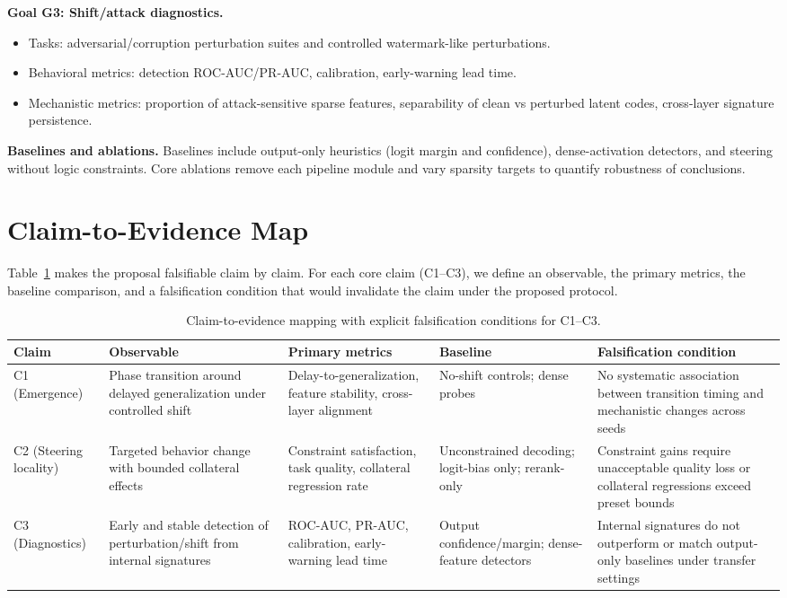 \documentclass[../ppgc-tese.tex]{subfiles}
\begin{document}
\textbf{Goal G3: Shift/attack diagnostics.}
\begin{itemize}
    \item Tasks: adversarial/corruption perturbation suites and controlled watermark-like perturbations.
    \item Behavioral metrics: detection ROC-AUC/PR-AUC, calibration, early-warning lead time.
    \item Mechanistic metrics: proportion of attack-sensitive sparse features, separability of clean vs perturbed latent codes, cross-layer signature persistence.
\end{itemize}

\textbf{Baselines and ablations.}
Baselines include output-only heuristics (logit margin and confidence), dense-activation detectors, and steering without logic constraints. Core ablations remove each pipeline module and vary sparsity targets to quantify robustness of conclusions.

\section{Claim-to-Evidence Map}
\label{sec:claim-evidence-map}
Table~\ref{tab:claim-evidence-falsification} makes the proposal falsifiable claim by claim. For each core claim (C1--C3), we define an observable, the primary metrics, the baseline comparison, and a falsification condition that would invalidate the claim under the proposed protocol.

\begin{table}[ht]
\centering
\small
\begin{tabular}{p{}p{}p{}p{}p{}}
\hline
\textbf{Claim} & \textbf{Observable} & \textbf{Primary metrics} & \textbf{Baseline} & \textbf{Falsification condition} \\
\hline
C1 (Emergence) &
Phase transition around delayed generalization under controlled shift &
Delay-to-generalization, feature stability, cross-layer alignment &
No-shift controls; dense probes &
No systematic association between transition timing and mechanistic changes across seeds \\

C2 (Steering locality) &
Targeted behavior change with bounded collateral effects &
Constraint satisfaction, task quality, collateral regression rate &
Unconstrained decoding; logit-bias only; rerank-only &
Constraint gains require unacceptable quality loss or collateral regressions exceed preset bounds \\

C3 (Diagnostics) &
Early and stable detection of perturbation/shift from internal signatures &
ROC-AUC, PR-AUC, calibration, early-warning lead time &
Output confidence/margin; dense-feature detectors &
Internal signatures do not outperform or match output-only baselines under transfer settings \\
\hline
\end{tabular}
\caption{Claim-to-evidence mapping with explicit falsification conditions for C1--C3.}
\label{tab:claim-evidence-falsification}
\end{table}
\end{document}
